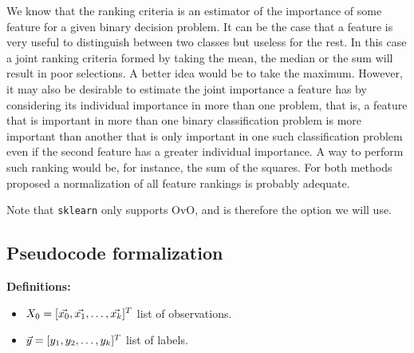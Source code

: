 We know that the ranking criteria is an estimator of the importance of some feature for a given binary decision problem. It can be the case that a feature is very useful to distinguish between two classes but useless for the rest. In this case a joint ranking criteria formed by taking the mean, the median or the sum will result in poor selections. A better idea would be to take the maximum. However, it may also be desirable to estimate the joint importance a feature has by considering its individual importance in more than one problem, that is, a feature that is important in more than one binary classification problem is more important than another that is only important in one such classification problem even if the second feature has a greater individual importance. A way to perform such ranking would be, for instance, the sum of the squares. For both methods proposed a normalization of all feature rankings is probably adequate.

Note that \texttt{sklearn} only supports OvO, and is therefore the option we will use.

\subsection{Pseudocode formalization}

\textbf{Definitions:}

\begin{itemize}
    \item $X_0 = [\vec{x_0}, \vec{x_1}, \dotsc, \vec{x_k}]^T$ list of observations.
    \item $\vec{y} = [y_1, y_2, \dotsc, y_k]^T$ list of labels.
\end{itemize}

